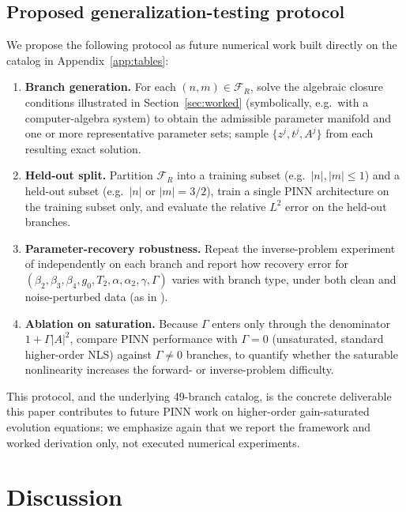 \documentclass[11pt]{article}
\begin{document}
\subsection{Proposed generalization-testing protocol}

We propose the following protocol as future numerical work built directly on the
catalog in Appendix~\ref{app:tables}:
\begin{enumerate}[label=(\roman*)]
\item \textbf{Branch generation.} For each $(n,m)\in\mathcal{F}_R$, solve the algebraic
closure conditions illustrated in Section~\ref{sec:worked} (symbolically, e.g.\ with a
computer-algebra system) to obtain the admissible parameter manifold and one or more
representative parameter sets; sample $\{z^j,t^j,A^j\}$ from each resulting exact solution.
\item \textbf{Held-out split.} Partition $\mathcal{F}_R$ into a training subset (e.g.\
$|n|,|m|\le 1$) and a held-out subset (e.g.\ $|n|$ or $|m|=3/2$), train a single PINN
architecture on the training subset only, and evaluate the relative $L^2$ error on the
held-out branches.
\item \textbf{Parameter-recovery robustness.} Repeat the inverse-problem experiment of
\citet{zhou2021,fang2021} independently on each branch and report how recovery error for
$(\beta_2,\beta_3,\beta_4,g_0,T_2,\alpha,\alpha_2,\gamma,\Gamma)$ varies with branch
type, under both clean and noise-perturbed data (as in \citet{zhou2021}).
\item \textbf{Ablation on saturation.} Because $\Gamma$ enters only through the
denominator $1+\Gamma|A|^2$, compare PINN performance with $\Gamma=0$ (unsaturated,
standard higher-order NLS) against $\Gamma\neq0$ branches, to quantify whether the
saturable nonlinearity increases the forward- or inverse-problem difficulty.
\end{enumerate}
This protocol, and the underlying 49-branch catalog, is the concrete deliverable this
paper contributes to future PINN work on higher-order gain-saturated evolution
equations; we emphasize again that we report the framework and worked derivation only,
not executed numerical experiments.

\section{Discussion}
\end{document}
